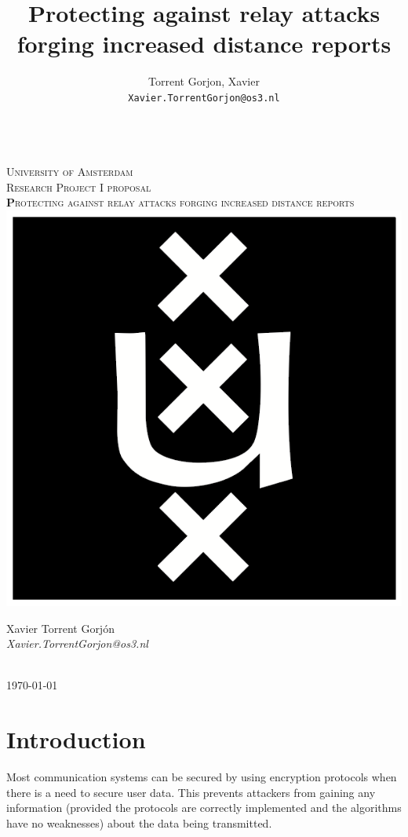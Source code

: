 \documentclass{article}
\author{
  Torrent Gorjon, Xavier\\
  \texttt{Xavier.TorrentGorjon@os3.nl}
}
\title{Protecting against relay attacks forging increased distance reports}
\begin{document}
\begin{titlepage}
\center
\textsc{}\\[1cm]
\textsc{\LARGE University of Amsterdam}\\[1.5cm]

\textsc{\Large Research Project I proposal}\\[0.5cm]

\textsc{\Huge \textbf Protecting against relay attacks forging increased distance reports}\\[1.5cm]

\includegraphics[scale=1]{images/uva.png}\\[1cm]

\begin{minipage}{0.5 \textwidth}
\begin{center} \large
Xavier Torrent Gorj\'{o}n\\
\emph{Xavier.TorrentGorjon@os3.nl}\\[0.5cm]
\end{center}
\end{minipage}\\[2cm]
{\large \today} 


\end{titlepage}


\newpage

\section{Introduction}
Most communication systems can be secured by using encryption protocols when there is a need to secure user data. This prevents attackers from gaining any information (provided the protocols are correctly implemented and the algorithms have no weaknesses) about the data being transmitted.
\end{document}
